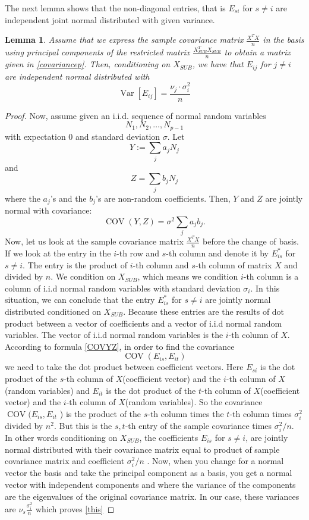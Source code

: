 \documentclass[12pt]{amsart}
\newtheorem{lemma}[theorem]{Lemma}
\theoremstyle{definition}
\DeclareMathOperator{\Cov}{COV}
\DeclareMathOperator{\Var}{Var}
\numberwithin{equation}{section}
\numberwithin{equation}{section}
\theoremstyle{remark}
\numberwithin{equation}{section}
\begin{document}
The next lemma shows that the non-diagonal entries, that is $E_{si}$ for $s\neq i$ are independent joint normal distributed with given variance.
\begin{lemma}\label{lemma2}
	Assume that we express the sample covariance matrix $\frac{X^T X}{n}$ in the basis
	using principal components of the restricted matrix $\frac{X^T_{SUB} X_{SUB}}{n}$
	to obtain a matrix given in \ref{covariancep}. Then, conditioning on
	$X_{SUB}$, we have that $E_{ij}$ for $j\neq i$ are independent normal distributed
	with
	\begin{equation}
	\label{this}
	\Var[E_{ij}]=\frac{\nu_j\cdot\sigma^2_i}{n}
	\end{equation}
\end{lemma}

\begin{proof}
	Now, assume given an i.i.d. sequence of normal random variables
	$$N_1,N_2,\ldots,N_{p-1}$$
	with expectation $0$ and standard deviation $\sigma$.
	Let
	$$Y:=\sum_j a_j N_j$$ and $$Z=\sum_j b_j N_j$$
	where the $a_j$'s and the $b_j$'s are non-random coefficients.
	Then, $Y$ and $Z$ are jointly normal with covariance:
	\begin{equation}
	\label{COVYZ}
	\Cov(Y,Z)=\sigma^2 \sum_j a_j b_j.
	\end{equation}
	Now, let us look at the sample covariance matrix $\frac{X^T X}{n}$ before the change of basis. If we look at the entry in the $i$-th row and $s$-th column and denote it by $E_{is}^*$ for $s\neq i$. The entry is the product of $i$-th column and $s$-th column of matrix $X$ and divided by $n$. We condition on $X_{SUB}$, which means we condition $i$-th column is a column of i.i.d normal random variables with standard deviation $\sigma_i$. In this situation, we can conclude that the entry $E_{is}^*$ for $s\neq i$ are jointly normal distributed conditioned on $X_{SUB}$. Because these entries are the results of dot product between a vector of coefficients and a vector of i.i.d normal random variables.
	The vector of i.i.d normal random variables is the $i$-th column of $X$.
	According to formula \ref{COVYZ}, in order to find  the covariance
	$$\Cov(E_{is},E_{it})$$
	we need to take the dot product between coefficient vectors.
	Here $E_{si}$ is the dot product of the $s$-th column of $X$(coefficient vector) and the $i$-th column of $X$(random variables) and $E_{it}$ is the dot product of the $t$-th column of $X$(coefficient vector) and the $i$-th column of $X$(random variables). So the covariance
	$\Cov(E_{is},E_{it}$ ) is the product of the $s$-th column times the $t$-th column times $\sigma_i^2$ divided by $n^2$. But this is the $s,t$-th entry of the sample covariance times $\sigma_i^2/n$. In other words conditioning on $X_{SUB}$, the coefficients $E_{is}$ for $s\neq i$, are jointly normal distributed with their covariance matrix equal to product of sample covariance matrix and coefficient $\sigma^2_i/n$ . Now, when you change for a normal vector the basis and take the principal component as a basis, you get a normal vector with independent components and where the variance of the components are the eigenvalues of the original covariance matrix. In our case, these variances are $\nu_s\frac{\sigma_i^2}{n}$ which proves
	\ref{this}
\end{proof}
\end{document}
